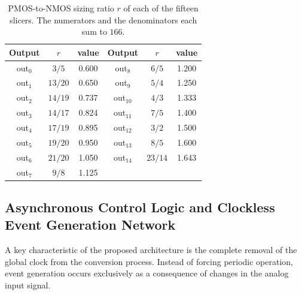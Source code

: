 \begin{table}[htbp]
    \centering
    \caption{PMOS-to-NMOS sizing ratio $r$ of each of the fifteen slicers. The numerators and the denominators each sum to $166$.}
    \label{tab:slicer_ratios}
    \renewcommand{\arraystretch}{1.2}
    \begin{tabular}{ccc@{\hskip 3em}ccc}
        \toprule
        \textbf{Output} & \textbf{$r$} & \textbf{value} & \textbf{Output} & \textbf{$r$} & \textbf{value} \\
        \midrule
        out$_0$ & $3/5$   & 0.600 & out$_8$  & $6/5$   & 1.200 \\
        out$_1$ & $13/20$ & 0.650 & out$_9$  & $5/4$   & 1.250 \\
        out$_2$ & $14/19$ & 0.737 & out$_{10}$ & $4/3$ & 1.333 \\
        out$_3$ & $14/17$ & 0.824 & out$_{11}$ & $7/5$ & 1.400 \\
        out$_4$ & $17/19$ & 0.895 & out$_{12}$ & $3/2$ & 1.500 \\
        out$_5$ & $19/20$ & 0.950 & out$_{13}$ & $8/5$ & 1.600 \\
        out$_6$ & $21/20$ & 1.050 & out$_{14}$ & $23/14$ & 1.643 \\
        out$_7$ & $9/8$   & 1.125 &          &         &       \\
        \bottomrule
    \end{tabular}
\end{table}
\paragraph{}
\paragraph{}
\paragraph{}
\subsection{Asynchronous Control Logic and Clockless Event Generation Network}
\label{sec:async_logic}

A key characteristic of the proposed architecture is the complete removal of the global clock from the conversion process. Instead of forcing periodic operation, event generation occurs exclusively as a consequence of changes in the analog input signal.

